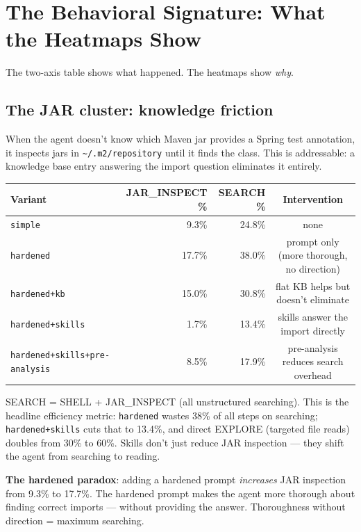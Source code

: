 \documentclass[11pt,a4paper]{article}
\begin{document}
\section{The Behavioral Signature: What the Heatmaps Show}

The two-axis table shows what happened. The heatmaps show \emph{why}.

\subsection*{The JAR cluster: knowledge friction}

When the agent doesn't know which Maven jar provides a Spring test annotation,
it inspects jars in \texttt{\textasciitilde/.m2/repository} until it finds the class.
This is addressable: a knowledge base entry answering the import question
eliminates it entirely.

\begin{center}
\begin{tabular}{@{}lrrc@{}}
\toprule
\textbf{Variant} & \textbf{JAR\_INSPECT \%} & \textbf{SEARCH \%} & \textbf{Intervention} \\
\midrule
\texttt{simple}              &  9.3\% & 24.8\% & none \\
\texttt{hardened}            & 17.7\% & 38.0\% & prompt only (more thorough, no direction) \\
\texttt{hardened+kb}         & 15.0\% & 30.8\% & flat KB helps but doesn't eliminate \\
\texttt{hardened+skills}     &  1.7\% & 13.4\% & skills answer the import directly \\
\texttt{hardened+skills+pre-analysis} &  8.5\% & 17.9\% & pre-analysis reduces search overhead \\
\bottomrule
\end{tabular}
\end{center}

SEARCH = SHELL + JAR\_INSPECT (all unstructured searching). This is the headline efficiency
metric: \texttt{hardened} wastes 38\% of all steps on searching; \texttt{hardened+skills}
cuts that to 13.4\%, and direct EXPLORE (targeted file reads) doubles from 30\% to 60\%.
Skills don't just reduce JAR inspection --- they shift the agent from searching to reading.

\begin{notebox}
\textbf{The hardened paradox}: adding a hardened prompt \emph{increases} JAR inspection
from 9.3\% to 17.7\%. The hardened prompt makes the agent more thorough about finding
correct imports --- without providing the answer. Thoroughness without direction =
maximum searching.
\end{notebox}
\end{document}
